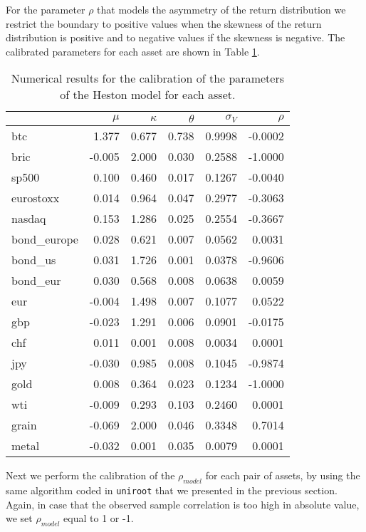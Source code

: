 For the parameter $\rho$ that models the asymmetry of the return distribution we restrict the boundary to positive values when the skewness of the return distribution is positive and to negative values if the skewness is negative. 
The calibrated parameters for each asset are shown in Table \ref{tab:heston_params}.

\begin{table}
	\centering
	\caption[Heston calibrated parameters]{Numerical results for the calibration of the parameters of the Heston model for each asset.}
	\label{tab:heston_params}
	\begin{tabular}{lrrrrr}
		
		& $\mu$ & $\kappa$ & $\theta$ & $\sigma_V$ & $\rho$ \\
		\midrule
		btc & 1.377 & 0.677 & 0.738 & 0.9998 & -0.0002 \\
		bric & -0.005 & 2.000 & 0.030 & 0.2588 & -1.0000 \\
		sp500 & 0.100 & 0.460 & 0.017 & 0.1267 & -0.0040 \\
		eurostoxx & 0.014 & 0.964 & 0.047 & 0.2977 & -0.3063 \\
		nasdaq & 0.153 & 1.286 & 0.025 & 0.2554 & -0.3667 \\
		bond\_europe & 0.028 & 0.621 & 0.007 & 0.0562 & 0.0031 \\
		bond\_us & 0.031 & 1.726 & 0.001 & 0.0378 & -0.9606 \\
		bond\_eur & 0.030 & 0.568 & 0.008 & 0.0638 & 0.0059 \\
		eur & -0.004 & 1.498 & 0.007 & 0.1077 & 0.0522 \\
		gbp & -0.023 & 1.291 & 0.006 & 0.0901 & -0.0175 \\
		chf & 0.011 & 0.001 & 0.008 & 0.0034 & 0.0001 \\
		jpy & -0.030 & 0.985 & 0.008 & 0.1045 & -0.9874 \\
		gold & 0.008 & 0.364 & 0.023 & 0.1234 & -1.0000 \\
		wti & -0.009 & 0.293 & 0.103 & 0.2460 & 0.0001 \\
		grain & -0.069 & 2.000 & 0.046 & 0.3348 & 0.7014 \\
		metal & -0.032 & 0.001 & 0.035 & 0.0079 & 0.0001 \\
		\midrule
	\end{tabular}
\end{table}


Next we perform the calibration of the  $\rho_{model}$ for each pair of assets, by using the same algorithm coded in \texttt{uniroot} that we presented  in the  previous section. Again, in case that the observed sample correlation is too high in absolute value, we set $\rho_{model}$ equal to 1 or -1.

